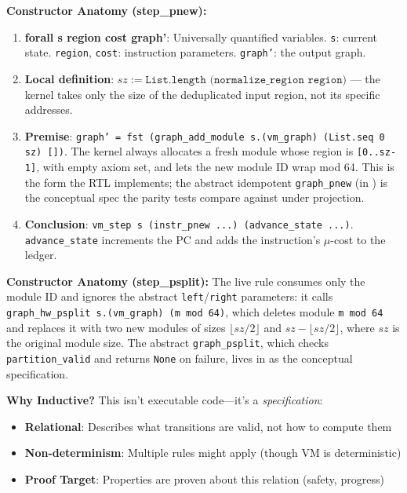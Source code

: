 \textbf{Constructor Anatomy (step\_pnew):}
\begin{enumerate}
    \item \textbf{forall s region cost graph'}: Universally quantified variables. \texttt{s}: current state. \texttt{region}, \texttt{cost}: instruction parameters. \texttt{graph'}: the output graph.
    \item \textbf{Local definition}: $sz := \texttt{List.length (normalize\_region region)}$ --- the kernel takes only the size of the deduplicated input region, not its specific addresses.
    \item \textbf{Premise}: \texttt{graph' = fst (graph\_add\_module s.(vm\_graph) (List.seq 0 sz) [])}. The kernel always allocates a fresh module whose region is \texttt{[0..sz-1]}, with empty axiom set, and lets the new module ID wrap mod 64. This is the form the RTL implements; the abstract idempotent \texttt{graph\_pnew} (in ) is the conceptual spec the parity tests compare against under projection.
    \item \textbf{Conclusion}: \texttt{vm\_step s (instr\_pnew ...) (advance\_state ...)}. \texttt{advance\_state} increments the PC and adds the instruction's $\mu$-cost to the ledger.
\end{enumerate}

\textbf{Constructor Anatomy (step\_psplit):} The live rule consumes only the module ID and ignores the abstract \texttt{left}/\texttt{right} parameters: it calls \texttt{graph\_hw\_psplit s.(vm\_graph) (m mod 64)}, which deletes module \texttt{m mod 64} and replaces it with two new modules of sizes $\lfloor sz/2 \rfloor$ and $sz - \lfloor sz/2 \rfloor$, where $sz$ is the original module size. The abstract \texttt{graph\_psplit}, which checks \texttt{partition\_valid} and returns \texttt{None} on failure, lives in  as the conceptual specification.

\textbf{Why Inductive?} This isn't executable code—it's a \emph{specification}:
\begin{itemize}
    \item \textbf{Relational}: Describes what transitions are valid, not how to compute them
    \item \textbf{Non-determinism}: Multiple rules might apply (though VM is deterministic)
    \item \textbf{Proof Target}: Properties are proven about this relation (safety, progress)
\end{itemize}

